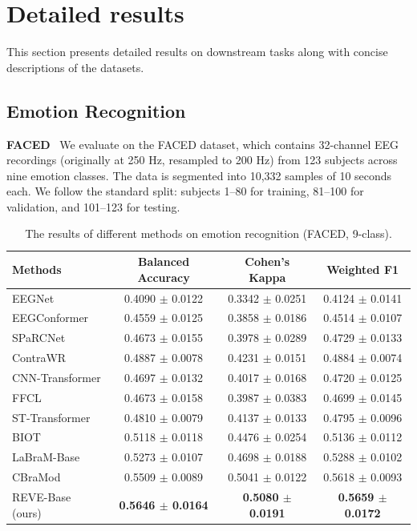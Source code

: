 \documentclass{article}
\begin{document}
\section{Detailed results}
\label{app:detailedresults}

This section presents detailed results on downstream tasks along with concise descriptions of the datasets.

\subsection{Emotion Recognition}

\textbf{FACED}~\citep{chen2023large} 
We evaluate on the FACED dataset, which contains 32-channel EEG recordings (originally at 250 Hz, resampled to 200 Hz) from 123 subjects across nine emotion classes. The data is segmented into 10,332 samples of 10 seconds each. We follow the standard split: subjects 1–80 for training, 81–100 for validation, and 101–123 for testing.

\begin{table}[H]
\centering
\caption{The results of different methods on emotion recognition (FACED, 9-class).}
\begin{tabular}{lccc} 
\toprule
\textbf{Methods} & \textbf{Balanced Accuracy} & \textbf{Cohen’s Kappa} & \textbf{Weighted F1} \\
\midrule
EEGNet            & 0.4090 $\pm$ 0.0122 & 0.3342 $\pm$ 0.0251 & 0.4124 $\pm$ 0.0141 \\
EEGConformer      & 0.4559 $\pm$ 0.0125 & 0.3858 $\pm$ 0.0186 & 0.4514 $\pm$ 0.0107 \\
SPaRCNet          & 0.4673 $\pm$ 0.0155 & 0.3978 $\pm$ 0.0289 & 0.4729 $\pm$ 0.0133 \\
ContraWR          & 0.4887 $\pm$ 0.0078 & 0.4231 $\pm$ 0.0151 & 0.4884 $\pm$ 0.0074 \\
CNN-Transformer   & 0.4697 $\pm$ 0.0132 & 0.4017 $\pm$ 0.0168 & 0.4720 $\pm$ 0.0125 \\
FFCL              & 0.4673 $\pm$ 0.0158 & 0.3987 $\pm$ 0.0383 & 0.4699 $\pm$ 0.0145 \\
ST-Transformer    & 0.4810 $\pm$ 0.0079 & 0.4137 $\pm$ 0.0133 & 0.4795 $\pm$ 0.0096 \\
\midrule
BIOT              & 0.5118 $\pm$ 0.0118 & 0.4476 $\pm$ 0.0254 & 0.5136 $\pm$ 0.0112 \\
LaBraM-Base       & 0.5273 $\pm$ 0.0107 & 0.4698 $\pm$ 0.0188 & 0.5288 $\pm$ 0.0102 \\
CBraMod         & 0.5509 $\pm$ 0.0089 & 0.5041 $\pm$ 0.0122 & 0.5618 $\pm$ 0.0093 \\
\midrule
REVE-Base (ours)        & \textbf{0.5646 $\pm$ 0.0164} & \textbf{0.5080 $\pm$ 0.0191} & \textbf{0.5659 $\pm$ 0.0172}  \\
\bottomrule
\end{tabular}

\label{tab:Emo}
\end{table}
\end{document}
